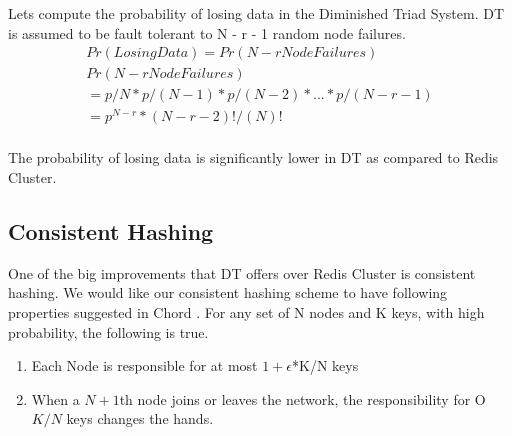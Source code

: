 \documentclass[10pt,twocolumn,letterpaper]{article}
\begin{document}
Lets compute the probability of losing data in the Diminished Triad System. DT is assumed to be fault tolerant to N - r - 1 random node failures.
\begin{equation}
\label{xx}
\begin{split}
Pr(Losing Data) = Pr(N - r  Node Failures)\\
Pr(N - r  Node Failures) \\
= p/N * p/(N-1) * p/(N-2) * ... * p/(N-r-1)\\
=p^{N-r}*(N-r-2)!/(N)!\\
\end{split}
\end{equation}

The probability of losing data is significantly lower in DT as compared to Redis Cluster.

\subsection{Consistent Hashing}
One of the big improvements that DT offers over Redis Cluster is consistent hashing. We would like our consistent hashing scheme to have following properties suggested in Chord \cite{chord}.
For any set of N nodes and K keys, with high probability, the following is true.
\begin{enumerate}
\item Each Node is responsible for at most \(1+ \epsilon\)*K/N keys
\item When a \(N+1\){th} node joins or leaves the network, the responsibility for O\(K/N\) keys changes the hands. 
\end{enumerate}
\end{document}
